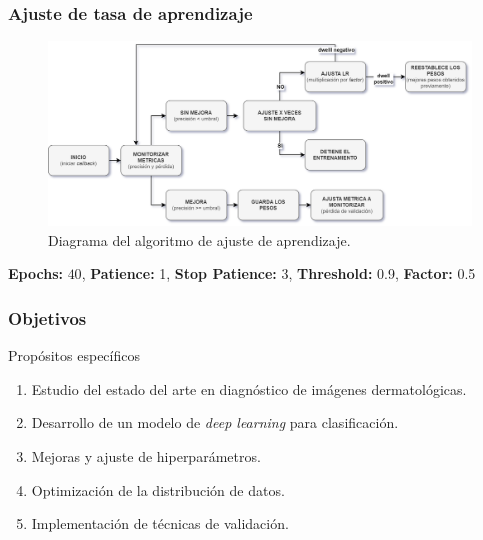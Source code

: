 \documentclass{beamer}
\begin{document}
\begin{frame}
  \frametitle{Ajuste de tasa de aprendizaje}
  \begin{figure}[H]
    \begin{center}
    \includegraphics[width=1\textwidth]{./Graphics/lra.drawio.png}
    \caption{Diagrama del algoritmo de ajuste de aprendizaje.}
    \label{fig:lra_permormance}
    \end{center}
  \end{figure}

\textbf{Epochs:} $40$, \textbf{Patience:} 1, \textbf{Stop Patience:} 3, \textbf{Threshold:}  0.9, \textbf{Factor:} 0.5
\end{frame}

\begin{frame}
  \frametitle{Objetivos}

    \begin{block}{Propósitos específicos}
      \small
      \begin{enumerate}
        \item<0> Estudio del estado del arte en diagnóstico de imágenes dermatológicas.
        \item<0> Desarrollo de un modelo de \textit{deep learning} para clasificación.
        \item<0> Mejoras y ajuste de hiperparámetros.
        \item<0-> Optimización de la distribución de datos.
        \item<0-> Implementación de técnicas de validación.
      \end{enumerate}
    \end{block}
\end{frame}
\end{document}
